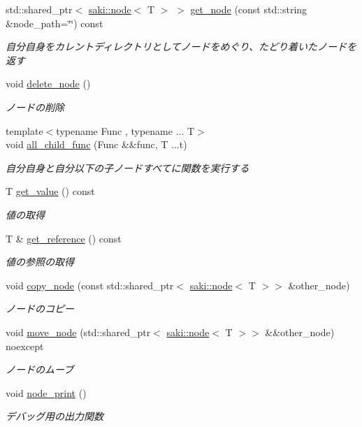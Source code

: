 \begin{DoxyCompactItemize}
std\+::shared\+\_\+ptr$<$ \mbox{\hyperlink{classsaki_1_1node}{saki\+::node}}$<$ T $>$ $>$ \mbox{\hyperlink{classsaki_1_1node_a7a485b3342124b691167a83caeacdb7c}{get\+\_\+node}} (const std\+::string \&node\+\_\+path=\char`\"{}\char`\"{}) const
\begin{DoxyCompactList}\small\item\em 自分自身をカレントディレクトリとしてノードをめぐり、たどり着いたノードを返す \end{DoxyCompactList}\item 
void \mbox{\hyperlink{classsaki_1_1node_aa850971614e4ee17f3a3c88a430d4cde}{delete\+\_\+node}} ()
\begin{DoxyCompactList}\small\item\em ノードの削除 \end{DoxyCompactList}\item 
{\footnotesize template$<$typename Func , typename ... T$>$ }\\void \mbox{\hyperlink{classsaki_1_1node_afff3ae61d8ebf51c352db29b8089ba41}{all\+\_\+child\+\_\+func}} (Func \&\&func, T ...t)
\begin{DoxyCompactList}\small\item\em 自分自身と自分以下の子ノードすべてに関数を実行する \end{DoxyCompactList}\item 
T \mbox{\hyperlink{classsaki_1_1node_a1c72cbf0e9180d7573ec664b011784e3}{get\+\_\+value}} () const
\begin{DoxyCompactList}\small\item\em 値の取得 \end{DoxyCompactList}\item 
T \& \mbox{\hyperlink{classsaki_1_1node_a2d1c317236e961030482f7d64d0d7905}{get\+\_\+reference}} () const
\begin{DoxyCompactList}\small\item\em 値の参照の取得 \end{DoxyCompactList}\item 
void \mbox{\hyperlink{classsaki_1_1node_a2edd5dac118d844a8ddf79a8c1ab98fe}{copy\+\_\+node}} (const std\+::shared\+\_\+ptr$<$ \mbox{\hyperlink{classsaki_1_1node}{saki\+::node}}$<$ T $>$$>$ \&other\+\_\+node)
\begin{DoxyCompactList}\small\item\em ノードのコピー \end{DoxyCompactList}\item 
void \mbox{\hyperlink{classsaki_1_1node_a56ab805f343c184a938ceb189cd8f1a8}{move\+\_\+node}} (std\+::shared\+\_\+ptr$<$ \mbox{\hyperlink{classsaki_1_1node}{saki\+::node}}$<$ T $>$$>$ \&\&other\+\_\+node) noexcept
\begin{DoxyCompactList}\small\item\em ノードのムーブ \end{DoxyCompactList}\item 
void \mbox{\hyperlink{classsaki_1_1node_acb9989adf40b835001b33f7c190e96bd}{node\+\_\+print}} ()
\begin{DoxyCompactList}\small\item\em デバッグ用の出力関数 \end{DoxyCompactList}\end{DoxyCompactItemize}
